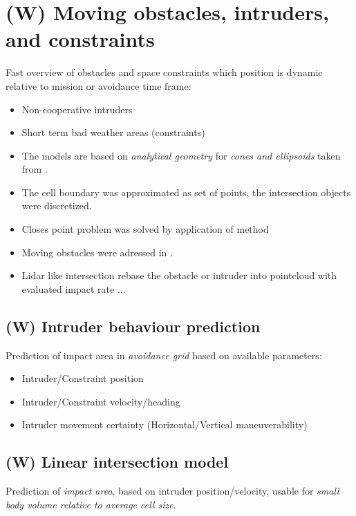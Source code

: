 \section{(W) Moving obstacles, intruders, and constraints}\label{s:intruders}
    \noindent Fast overview of obstacles and space constraints which position is dynamic relative to mission or avoidance time frame:
    \begin{itemize}
        \item Non-cooperative intruders
        \item Short term bad weather areas (constraints)
        \item The models are based on \emph{analytical geometry} for \emph{cones and ellipsoids} taken from \cite{sommerville2016analytical}.
        \item The cell boundary was approximated as set of points, the intersection objects were discretized.
        \item Closes point problem \cite{shamos1975closest} was solved by application of method  \cite{bentley1980optimal}
		\item Moving obstacles were adressed in \cite{fiorini1998motion}.
		\item Lidar like intersection rebase the obstacle or intruder into pointcloud with evaluated impact rate ...
    \end{itemize}
    
\subsection{(W) Intruder behaviour prediction}\label{s:intruderBehaviourPrediction}
    \noindent Prediction of impact area in \emph{avoidance grid} based on available parameters:
    \begin{itemize}
        \item Intruder/Constraint position
        \item Intruder/Constraint velocity/heading
        \item Intruder movement certainty (Horizontal/Vertical maneuverability)
    \end{itemize}
    
\subsection{(W) Linear intersection model}\label{s:linearIntersectionModel}
    \noindent Prediction of \emph{impact area}, based on intruder position/velocity, usable for \emph{small body volume relative to average cell size}.
    
